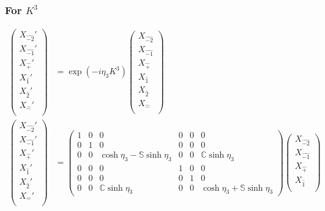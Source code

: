 \documentclass[]{article}
\numberwithin{equation}{section}
\begin{document}
{{\subsubsection{For $K^{3}$}
\begin{align}
\begin{pmatrix}
    {X}_{\hat{-2}}'\\
    {X}_{\hat{-1}}'\\
    {X}_{\hat{+}}'\\
    {X}_{\hat{1}}'\\
    {X}_{\hat{2}}'\\
    {X}_{\hat{-}}'\\
    \end{pmatrix}&= \exp{(-i\eta_{3}K^{3})}\begin{pmatrix}
    {X}_{\hat{-2}}\\
    {X}_{\hat{-1}}\\
    {X}_{\hat{+}}\\
    {X}_{\hat{1}}\\
    {X}_{\hat{2}}\\
    {X}_{\hat{-}}\\
    \end{pmatrix}\\
    \begin{pmatrix}
    {X}_{\hat{-2}}'\\
    {X}_{\hat{-1}}'\\
    {X}_{\hat{+}}'\\
    {X}_{\hat{1}}'\\
    {X}_{\hat{2}}'\\
    {X}_{\hat{-}}'\\
    \end{pmatrix}&= \begin{pmatrix}
        1&0&0&0&0&0\\
        0&1&0&0&0&0\\
        0&0&\cosh{\eta_{3}}-\mathbb{S}\sinh{\eta_{3}}&0&0&\mathbb{C}\sinh{\eta_{3}}\\
        0&0&0&1&0&0\\
        0&0&0&0&1&0\\
        0&0&\mathbb{C}\sinh{\eta_{3}}&0&0&\cosh{\eta_{3}}+\mathbb{S}\sinh{\eta_{3}}
    \end{pmatrix}\begin{pmatrix}
    {X}_{\hat{-2}}\\
    {X}_{\hat{-1}}\\
    {X}_{\hat{+}}\\
    {X}_{\hat{1}}\\

\end{pmatrix}
\end{align}}}
\end{document}
